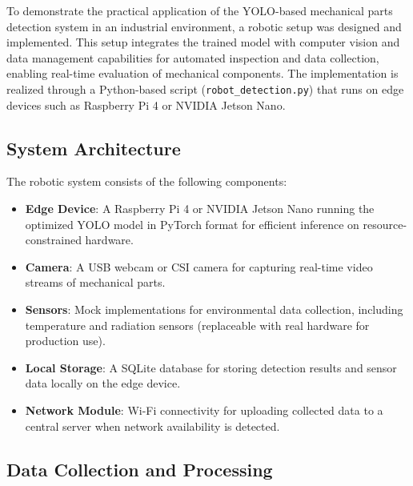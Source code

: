 \documentclass[12pt,a4paper]{article}
\begin{document}
To demonstrate the practical application of the YOLO-based mechanical parts detection system in an industrial environment, a robotic setup was designed and implemented. This setup integrates the trained model with computer vision and data management capabilities for automated inspection and data collection, enabling real-time evaluation of mechanical components. The implementation is realized through a Python-based script (\texttt{robot\_detection.py}) that runs on edge devices such as Raspberry Pi 4 or NVIDIA Jetson Nano.

\subsection{System Architecture}

The robotic system consists of the following components:
\begin{itemize}
\item \textbf{Edge Device}: A Raspberry Pi 4 or NVIDIA Jetson Nano running the optimized YOLO model in PyTorch format for efficient inference on resource-constrained hardware.
\item \textbf{Camera}: A USB webcam or CSI camera for capturing real-time video streams of mechanical parts.
\item \textbf{Sensors}: Mock implementations for environmental data collection, including temperature and radiation sensors (replaceable with real hardware for production use).
\item \textbf{Local Storage}: A SQLite database for storing detection results and sensor data locally on the edge device.
\item \textbf{Network Module}: Wi-Fi connectivity for uploading collected data to a central server when network availability is detected.
\end{itemize}

\subsection{Data Collection and Processing}
\end{document}

